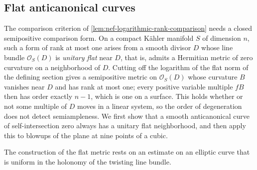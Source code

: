 \subsection{Flat anticanonical curves}\label{subsec:nef-flat-anticanonical-curves}

The comparison criterion of \cref{lem:nef-logarithmic-rank-comparison} needs a closed semipositive comparison form. On a compact K\"ahler manifold $S$ of dimension $n$, such a form of rank at most one arises from a smooth divisor $D$ whose line bundle $\mathcal O_S(D)$ is \emph{unitary flat} near $D$, that is, admits a Hermitian metric of zero curvature on a neighborhood of $D$. Cutting off the logarithm of the flat norm of the defining section gives a semipositive metric on $\mathcal O_S(D)$ whose curvature $B$ vanishes near $D$ and has rank at most one; every positive variable multiple $fB$ then has order exactly $n-1$, which is one on a surface. This holds whether or not some multiple of $D$ moves in a linear system, so the order of degeneration does not detect semiampleness. We first show that a smooth anticanonical curve of self-intersection zero always has a unitary flat neighborhood, and then apply this to blowups of the plane at nine points of a cubic.

The construction of the flat metric rests on an estimate on an elliptic curve that is uniform in the holonomy of the twisting line bundle.

